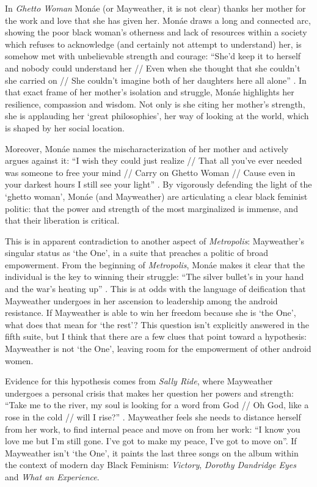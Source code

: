 \documentclass[a4paper, 11pt]{article} %
\begin{document}
In \emph{Ghetto Woman} Mon\'ae (or Mayweather, it is not clear) thanks her mother for the work and love that she has given her.
Mon\'ae draws a long and connected arc, showing the poor black woman's otherness and lack of resources within a society which refuses to acknowledge (and certainly not attempt to understand) her, is somehow met with unbelievable strength and courage:
``She'd keep it to herself and nobody could understand her // Even when she thought that she couldn't she carried on // She couldn't imagine both of her daughters here all alone'' .
In that exact frame of her mother's isolation and struggle, Mon\'ae highlights her resilience, compassion and wisdom.
Not only is she citing her mother's strength, she is applauding her `great philosophies', her way of looking at the world, which is shaped by her social location.

Moreover, Mon\'ae names the mischaracterization of her mother and actively argues against it:
``I wish they could just realize // That all you've ever needed was someone to free your mind // Carry on Ghetto Woman // Cause even in your darkest hours I still see your light'' .
By vigorously defending the light of the `ghetto woman', Mon\'ae (and Mayweather) are articulating a clear black feminist politic: that the power and strength of the most marginalized is immense, and that their liberation is critical. 

This is in apparent contradiction to another aspect of \emph{Metropolis}: Mayweather's singular status as `the One', in a suite that preaches a politic of broad empowerment.
From the beginning of \emph{Metropolis}, Mon\'ae makes it clear that the individual is the key to winning their struggle:
``The silver bullet's in your hand and the war's heating up'' .
This is at odds with the language of deification that Mayweather undergoes in her ascension to leadership among the android resistance.
 If Mayweather is able to win her freedom because she is `the One', what does that mean for `the rest'?
This question isn't explicitly answered in the fifth suite, but I think that there are a few clues that point toward a hypothesis: Mayweather is not `the One', leaving room for the empowerment of other android women.

Evidence for this hypothesis comes from \emph{Sally Ride}, where Mayweather undergoes a personal crisis that makes her question her powers and strength:
 ``Take me to the river, my soul is looking for a word from God // Oh God, like a rose in the cold // will I rise?'' .
Mayweather feels she needs to distance herself from her work, to find internal peace and move on from her work:
 ``I know you love me but I'm still gone. I've got to make my peace, I've got to move on''.
 If Mayweather isn't `the One', it paints the last three songs on the album within the context of modern day Black Feminism: \emph{Victory}, \emph{Dorothy Dandridge Eyes} and \emph{What an Experience}.
 
\end{document}
